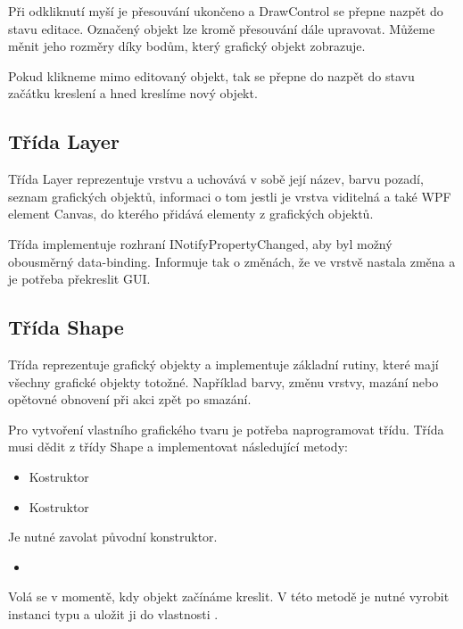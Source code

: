\documentclass[
  field=inf,
  biblatex,
  glossaries,
  index
]{kidiplom}
\begin{document}
Při odkliknutí myší je přesouvání ukončeno a DrawControl se přepne nazpět do stavu editace. Označený objekt lze kromě přesouvání dále upravovat. Můžeme měnit jeho rozměry díky bodům, který grafický objekt zobrazuje.

Pokud klikneme mimo editovaný objekt, tak se přepne do nazpět do stavu začátku kreslení a hned kreslíme nový objekt.

\subsection{Třída Layer}

Třída Layer reprezentuje vrstvu a uchovává v sobě její název, barvu pozadí, seznam grafických objektů, informaci o tom jestli je vrstva viditelná a také WPF element Canvas, do kterého přidává elementy z grafických objektů. 

Třída implementuje rozhraní INotifyPropertyChanged, aby byl možný obousměrný data-binding. Informuje tak o změnách, že ve vrstvě nastala změna a je potřeba překreslit GUI.

\subsection{Třída Shape}

Třída reprezentuje grafický objekty a implementuje základní rutiny, které mají všechny grafické objekty totožné. Například barvy, změnu vrstvy, mazání nebo opětovné obnovení při akci zpět po smazání.

Pro vytvoření vlastního grafického tvaru je potřeba naprogramovat třídu. Třída musi dědit z třídy Shape a implementovat následující metody:

\begin{itemize}
\item Kostruktor 
\item Kostruktor 
\end{itemize}
Je nutné zavolat původní konstruktor.

\begin{itemize}
\item {}
\end{itemize}
Volá se v momentě, kdy objekt začínáme kreslit. V této metodě je nutné vyrobit instanci typu  a uložit ji do vlastnosti .
\end{document}
